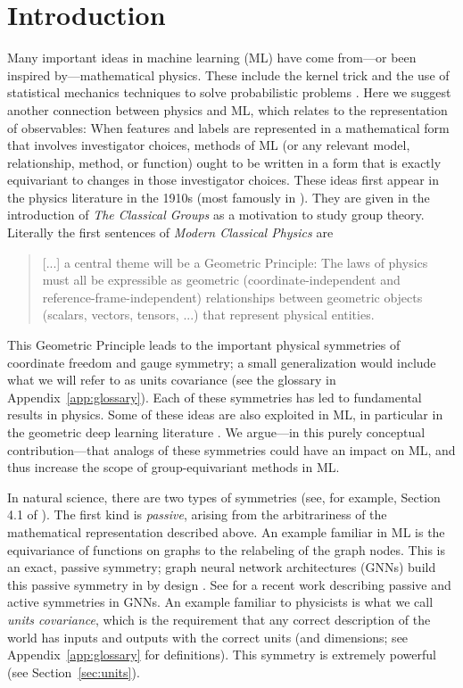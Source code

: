 \documentclass[accepted]{article}
\newcommand{\sectionname}{Section}
\newcommand{\secref}[1]{\sectionname~\ref{#1}}
\newcommand{\appref}[1]{Appendix~\ref{#1}}
\begin{document}
\section{Introduction}\label{sec:intro}
Many important ideas in machine learning (ML) have come from---or been inspired by---mathematical physics.
These include the kernel trick \citep{CouHil53,SchSmo02} and the use of statistical mechanics techniques to solve probabilistic problems \citep{mcmc, gibbs}.
Here we suggest another connection between physics and ML, which relates to the representation of observables:
When features and labels are represented in a mathematical form that involves investigator choices, methods of ML (or any relevant model, relationship, method, or function) ought to be written in a form that is exactly equivariant to changes in those investigator choices.
These ideas first appear in the physics literature in the 1910s (most famously in \citealt{gr}). They are given in the introduction of \textit{The Classical Groups} \citep{weyl} as a motivation to study group theory.
Literally the first sentences of \textit{Modern Classical Physics} \citep{mcp} are
\begin{quote}
[...] a central theme will be a Geometric Principle: 
The laws of physics must all
be expressible as geometric (coordinate-independent and reference-frame-independent)
relationships between geometric objects (scalars, vectors, tensors, ...) that represent
physical entities.
\end{quote}
This Geometric Principle leads to the important physical symmetries of coordinate freedom and gauge symmetry; a small generalization would include what we will refer to as units covariance (see the glossary in \appref{app:glossary}).
Each of these symmetries has led to fundamental results in physics. Some of these ideas are also exploited in ML, in particular in the geometric deep learning literature \citep{bronstein2021geometric, weiler}. 
We argue---in this purely conceptual contribution---that analogs of these symmetries could have an impact on ML, and thus increase the scope of group-equivariant methods in ML.

In natural science, there are two types of symmetries (see, for example, Section 4.1 of \citealt{rovelli2000loop}). 
The first kind is \emph{passive}, arising from the arbitrariness of the mathematical representation described above.
An example familiar in ML is the equivariance of functions on graphs to the relabeling of the graph nodes.
This is an exact, passive symmetry; graph neural network architectures (GNNs) build this passive symmetry in by design \citep{bruna2013spectral, duvenaud2015convolutional, gilmer2017neural, hamilton2020graph}. See \cite{huang2023approximately} for a recent work describing passive and active symmetries in GNNs.
An example familiar to physicists is what we call \emph{units covariance}, which is the requirement that any correct description of the world has inputs and outputs with the correct units (and dimensions; see \appref{app:glossary} for definitions).
This symmetry is extremely powerful (see \secref{sec:units}).
\end{document}
